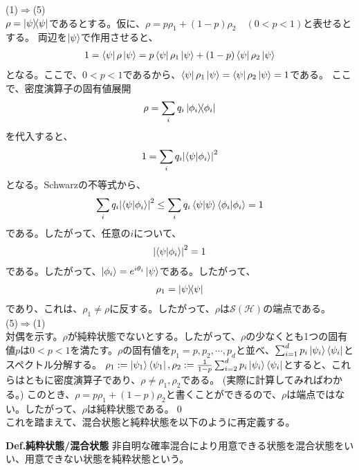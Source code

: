 \documentclass[a4paper,11pt]{jsarticle}
\numberwithin{equation}{section}
\begin{document}
(1)$\Rightarrow$(5)\\
$\rho = \ketbra{\psi}{\psi}$であるとする。仮に、$\rho = p\rho_1 + (1-p)\rho_2\quad (0 < p < 1)$と表せるとする。
両辺を$\ket{\psi}$で作用させると、
\begin{align}
    1 = \bra{\psi}\rho\ket{\psi} = p\bra{\psi}\rho_1\ket{\psi} + (1-p)\bra{\psi}\rho_2\ket{\psi}
\end{align}
となる。ここで、$0<p<1$であるから、$\bra{\psi}\rho_1\ket{\psi} = \bra{\psi}\rho_2\ket{\psi} = 1$である。
ここで、密度演算子の固有値展開
\begin{align}
    \rho = \sum_i q_i\ketbra{\phi_i}{\phi_i}
\end{align}
を代入すると、
\begin{align}
    1 = \sum_i q_i\abs{\braket{\psi}{\phi_i}}^2
\end{align}
となる。Schwarzの不等式から、
\begin{align}
    \sum_i q_i \abs{\braket{\psi}{\phi_i}}^2 \leq \sum_i q_i \braket{\psi}{\psi}\braket{\phi_i}{\phi_i} = 1
\end{align}
である。したがって、任意の$i$について、
\begin{align}
    \abs{\braket{\psi}{\phi_i}}^2 = 1
\end{align}
である。したがって、$\ket{\phi_i} = e^{i\theta_i}\ket{\psi}$である。したがって、
\begin{align}
    \rho_1 = \ketbra{\psi}{\psi}
\end{align}
であり、これは、$\rho_1 \neq \rho$に反する。したがって、$\rho$は$\mathcal{S}(\mathcal{H})$の端点である。\\
(5)$\Rightarrow$(1)\\
対偶を示す。$\rho$が純粋状態でないとする。したがって、$\rho$の少なくとも1つの固有値$p$は$0<p<1$を満たす。$\rho$の固有値を$p_1 = p,p_2,\cdots,p_d$と並べ、$\sum_{i=1}^{d} p_i\ket{\psi_i}\bra{\psi_i}$とスペクトル分解する。
$\rho_1 := \ket{\psi_1}\bra{\psi_1}, \rho_2 := \frac{1}{1-p} \sum_{i=2}^{d} p_i\ket{\psi_i}\bra{\psi_i}$とすると、これらはともに密度演算子であり、$\rho \neq \rho_1,\rho_2$である。
(実際に計算してみればわかる。)
このとき、$\rho = p \rho_1 + (1-p)\rho_2$と書くことができるので、$\rho$は端点ではない。したがって、$\rho$は純粋状態である。\qed\\

これを踏まえて、混合状態と純粋状態を以下のように再定義する。
\begin{itembox}[l]{\textbf{Def.純粋状態/混合状態}}
    非自明な確率混合により用意できる状態を混合状態をいい、用意できない状態を純粋状態という。
\end{itembox}
\end{document}
